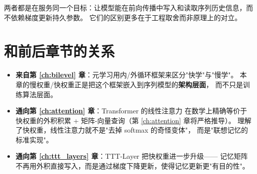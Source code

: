 两者都是在服务同一个目标：让模型能在前向传播中写入和读取序列历史信息，而不依赖梯度更新持久参数。
它们的区别更多在于工程取舍而非原理上的对立。

\section{和前后章节的关系}
\label{sec:fastweights_bridges}

\begin{itemize}
  \item \textbf{来自第 \ref{ch:bilevel} 章}：元学习用内/外循环框架来区分"快学"与"慢学"。
        本章的慢权重/快权重正是把这个框架嵌入到序列模型的\textbf{架构层面}，
        而不只是训练算法层面。

  \item \textbf{通向第 \ref{ch:attention} 章}：Transformer 的线性注意力
        在数学上精确等价于快权重的外积积累 + 矩阵-向量查询（第 \ref{ch:attention} 章将严格推导）。
        理解了快权重，线性注意力就不是"去掉 softmax 的奇怪变体"，
        而是"联想记忆的标准实现"。

  \item \textbf{通向第 \ref{ch:ttt_layers} 章}：TTT-Layer 把快权重进一步升级——
        记忆矩阵不再用外积直接写入，而是通过梯度下降更新，使得记忆更新更"有目的性"。
\end{itemize}

